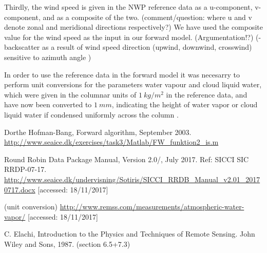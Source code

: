 \documentclass[11pt, a4paper]{article}
\begin{document}
Thirdly, the wind speed is given in the NWP reference data as a u-component, v-component, and as a composite of the two. (comment/question: where u and v denote zonal and meridional directions respectively?) We have used the composite value for the wind speed as the input in our forward model. (Argumentation!?) (-backscatter as a result of wind speed direction (upwind, downwind, crosswind) sensitive to azimuth angle \cite{Elachi})
\newline

In order to use the reference data in the forward model it was necesarry to perform unit conversions for the parameters water vapour and cloud liquid water, which were given in the columnar units of $\SI{1}{kg/m^2}$ in the reference data, and have now been converted to $\SI{1}{mm}$, indicating the height of water vapor or cloud liquid water if condensed uniformly across the column \cite{remss}. \newline









\begin{thebibliography}{99}
	 Dorthe Hofman-Bang, Forward algorithm, September 2003. \newline \url{http://www.seaice.dk/exercises/task3/Matlab/FW_funktion2_is.m} \newline [accessed: 18/11/2017]
	
	
	 Round Robin Data Package Manual, Version 2.0/, July 2017. Ref: SICCI SIC RRDP-07-17. \newline
	\url{http://www.seaice.dk/undervisning/Sotiris/SICCI_RRDB_Manual_v2.01_20170717.docx} [accessed: 18/11/2017]
	
	 (unit conversion) \url{http://www.remss.com/measurements/atmospheric-water-vapor/} [accessed: 18/11/2017]
	
	  C. Elachi, Introduction to the Physics and Techniques of Remote Sensing. John Wiley and Sons, 1987. (section 6.5+7.3)
	
\end{thebibliography}
\end{document}
